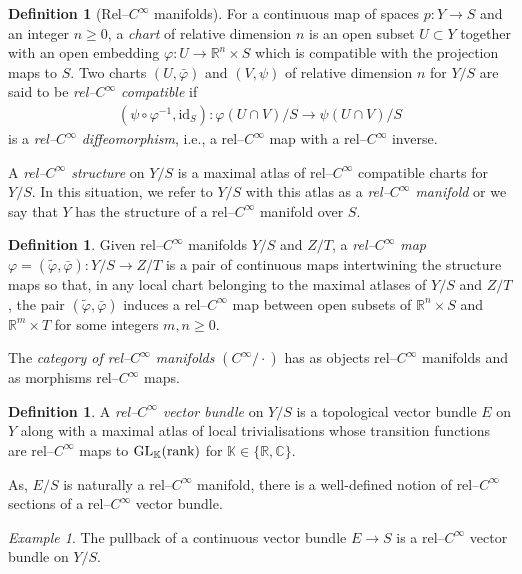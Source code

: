 \documentclass[11pt,psamsfonts, oneside, reqno]{amsart}
\newcommand{\cl}{\colon}
\newcommand{\GL}{\normalfont\text{GL}}
\newcommand{\bC}{\mathbb{C}}
\newcommand{\bK}{\mathbb{K}}
\newcommand{\bR}{\mathbb{R}}
\newcommand{\rank}{\normalfont\text{rank}}
\theoremstyle{definition}
\newtheorem{definition}[theorem]{Definition}
\theoremstyle{remark}
\newtheorem{example}[theorem]{Example}
\numberwithin{equation}{section}
\begin{document}
\begin{definition}[Rel--$C^\infty$ manifolds]
	For a continuous map of spaces $p\cl Y\to S$ and an integer $n\ge 0$, a \emph{chart} of relative dimension $n$ is an open subset $U\subset Y$ together with an open embedding $\varphi\cl U\to \bR^n\times S$ which is compatible with the projection maps to $S$. Two charts $(U,\bar{\varphi})$ and $(V,\psi)$ of relative dimension $n$ for $Y/S$ are said to be \emph{rel--$C^\infty$ compatible} if
	\begin{align*}
		(\psi\circ\varphi^{-1},\text{id}_S)\cl \varphi(U\cap V)/S\to\psi(U\cap V)/S
	\end{align*}
	is a \emph{rel--$C^\infty$ diffeomorphism}, i.e., a rel--$C^\infty$ map with a rel--$C^\infty$ inverse.
	
	A \emph{rel--$C^\infty$ structure} on $Y/S$ is a maximal atlas of rel--$C^\infty$ compatible charts for $Y/S$. In this situation, we refer to $Y/S$ with this atlas as a \emph{rel--$C^\infty$ manifold} or we say that $Y$ has the structure of a rel--$C^\infty$ manifold over $S$.
\end{definition}

\begin{definition}	Given rel--$C^\infty$ manifolds $Y/S$ and $Z/T$, a \emph{rel--$C^\infty$ map $\varphi=(\tilde\varphi,\bar{\varphi})\cl Y/S\to Z/T$} is a pair of continuous maps intertwining the structure maps so that, in any local chart belonging to the maximal atlases of $Y/S$ and $Z/T$, the pair $(\tilde\varphi,\bar{\varphi})$ induces a rel--$C^\infty$ map between open subsets of $\bR^n\times S$ and $\bR^m\times T$ for some integers $m,n\ge 0$.
	
	The \emph{category of rel--$C^\infty$ manifolds} $(C^\infty/\cdot)$ has as objects rel--$C^\infty$ manifolds and as morphisms rel--$C^\infty$ maps.
\end{definition}

\begin{definition} A \emph{rel--$C^\infty$ vector bundle} on $Y/S$ is a topological vector bundle $E$ on $Y$ along with a maximal atlas of local trivialisations whose transition functions are rel--$C^\infty$ maps to $\GL_\bK(\rank)$ for $\bK\in \{\bR,\bC\}$. 
\end{definition}

\noindent
As, $E/S$ is naturally a rel--$C^\infty$ manifold, there is a well-defined notion of rel--$C^\infty$ sections of a rel--$C^\infty$ vector bundle.

\begin{example} The pullback of a continuous vector bundle $E\to S$ is a rel--$C^\infty$ vector bundle on $Y/S$.
\end{example}
\end{document}
